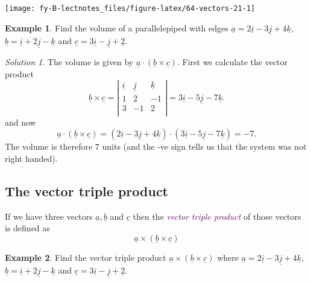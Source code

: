 \documentclass[
  english,
  11pt,
  oneside]{book}
\newcommand{\slide}{}
\theoremstyle{definition}
\theoremstyle{definition}
\newtheorem{example}{Example}[chapter]
\theoremstyle{definition}
\theoremstyle{definition}
\theoremstyle{remark}
\newtheorem*{solution}{Solution}
\begin{document}
\begin{center}\texttt{[image: fy-B-lectnotes\_files/figure-latex/64-vectors-21-1]} \end{center}

\slide

\begin{example}
Find the volume of a parallelepiped with edges \(\underline a = 2\underline i - 3\underline j + 4\underline k\), \(\underline b = \underline i + 2\underline j - \underline k\) and \(\underline c = 3\underline i - \underline j + \underline 2\).
\end{example}

\begin{solution}
The volume is given by \(\underline a \cdot(\underline b\times\underline c)\). First we calculate the vector product
\[
\underline b \times\underline c = \left|\begin{array}{ccc}\underline i&\underline j&\underline k\\1&2&-1\\3&-1&2\\\end{array}\right| = 3\underline i-5\underline j-7\underline k.
\]
and now
\[
\underline a \cdot(\underline b\times\underline c) = (2\underline i - 3\underline j + 4\underline k)\cdot(3\underline i-5\underline j-7\underline k) = -7.
\]
The volume is therefore \(7\) units (and the -ve sign tells us that the system was not right handed).
\end{solution}

\slide

\subsection{The vector triple product}\label{the-vector-triple-product}

If we have three vectors \(\underline a, \underline b\) and \(\underline c\) then the \textcolor{purple}{\em vector triple product} of those vectors is defined as
\[
\underline a \times (\underline b \times\underline c)
\]

\begin{example}
Find the vector triple product \(\underline a \times (\underline b \times\underline c)\) where \(\underline a = 2\underline i - 3\underline j + 4\underline k\), \(\underline b = \underline i + 2\underline j - \underline k\) and \(\underline c = 3\underline i - \underline j + \underline 2\).
\end{example}
\end{document}
